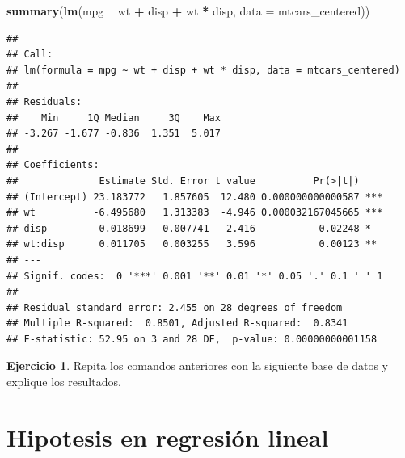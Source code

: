 \documentclass[
  12pt,
]{book}
\newenvironment{Shaded}{\begin{snugshade}}{\end{snugshade}}
\newcommand{\DataTypeTok}[1]{\textcolor[rgb]{0.13,0.29,0.53}{#1}}
\newcommand{\KeywordTok}[1]{\textcolor[rgb]{0.13,0.29,0.53}{\textbf{#1}}}
\newcommand{\NormalTok}[1]{#1}
\newcommand{\OperatorTok}[1]{\textcolor[rgb]{0.81,0.36,0.00}{\textbf{#1}}}
\newcommand{\OtherTok}[1]{\textcolor[rgb]{0.56,0.35,0.01}{#1}}
\newcommand{\StringTok}[1]{\textcolor[rgb]{0.31,0.60,0.02}{#1}}
\theoremstyle{definition}
\theoremstyle{definition}
\theoremstyle{definition}
\newtheorem{exercise}{Ejercicio}[chapter]
\theoremstyle{remark}
\begin{document}
\begin{Shaded}
\begin{Highlighting}[]
\KeywordTok{summary}\NormalTok{(}\KeywordTok{lm}\NormalTok{(mpg }\OperatorTok{~}\StringTok{ }\NormalTok{wt }\OperatorTok{+}\StringTok{ }\NormalTok{disp }\OperatorTok{+}\StringTok{ }\NormalTok{wt }\OperatorTok{*}\StringTok{ }\NormalTok{disp, }\DataTypeTok{data =}\NormalTok{ mtcars_centered))}
\end{Highlighting}
\end{Shaded}

\begin{verbatim}
## 
## Call:
## lm(formula = mpg ~ wt + disp + wt * disp, data = mtcars_centered)
## 
## Residuals:
##    Min     1Q Median     3Q    Max 
## -3.267 -1.677 -0.836  1.351  5.017 
## 
## Coefficients:
##              Estimate Std. Error t value          Pr(>|t|)    
## (Intercept) 23.183772   1.857605  12.480 0.000000000000587 ***
## wt          -6.495680   1.313383  -4.946 0.000032167045665 ***
## disp        -0.018699   0.007741  -2.416           0.02248 *  
## wt:disp      0.011705   0.003255   3.596           0.00123 ** 
## ---
## Signif. codes:  0 '***' 0.001 '**' 0.01 '*' 0.05 '.' 0.1 ' ' 1
## 
## Residual standard error: 2.455 on 28 degrees of freedom
## Multiple R-squared:  0.8501, Adjusted R-squared:  0.8341 
## F-statistic: 52.95 on 3 and 28 DF,  p-value: 0.00000000001158
\end{verbatim}

\begin{exercise}

Repita los comandos anteriores con la siguiente base de datos y explique los resultados.

\begin{Shaded}
\end{Shaded}

\end{exercise}

\hypertarget{hipotesis-en-regresiuxf3n-lineal}{%
\section{Hipotesis en regresión lineal}\label{hipotesis-en-regresiuxf3n-lineal}}
\end{document}
